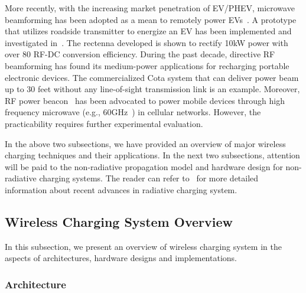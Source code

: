 \documentclass[twocolumn,10pt]{IEEEtran}
\begin{document}
More recently, with the increasing market penetration of EV/PHEV, microwave beamforming has been adopted as a mean to remotely power EVs~\cite{N.2011Shinohara,N2011Shinohara,N.2013Shinohara,Y.2012Kubo,N2013Shinohara}.
A prototype that utilizes roadside transmitter to energize an EV has been implemented and investigated in~\cite{N.2013Shinohara}. The rectenna developed is shown to rectify 10kW power with over 80 RF-DC conversion efficiency.
During the past decade, directive RF beamforming has found its medium-power applications for recharging portable electronic devices. The commercialized Cota system \cite{cota,cota_system} that can deliver power beam up to 30 feet without any line-of-sight transmission link is an example. Moreover, RF power beacon~\cite{K1207.5640Huang,Erol-Kantarci2014} has been advocated to power mobile devices through high frequency microwave (e.g., 60GHz~\cite{K.2015Huang}) in cellular networks. However, the practicability requires further experimental evaluation.  


 

In the above two subsections, we have provided an overview of major wireless charging techniques and their applications. In the next two subsections, attention will be paid to the non-radiative propagation model and hardware design for non-radiative charging systems. The reader can refer to~\cite{X.LuSurvey} for more detailed information about recent advances in radiative charging system.   
 




\subsection{Wireless Charging System Overview}

In this subsection, we present an overview of wireless charging system in the aspects of architectures, hardware designs and implementations. 

\subsubsection{Architecture}
\end{document}
